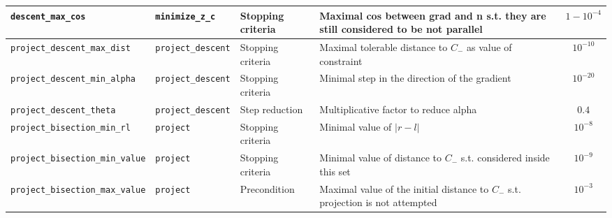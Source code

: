 \documentclass[a4paper]{article}
\begin{document}
\begin{tabular}{|p{47mm}|p{27mm}|p{34mm}|p{130mm}|c|}
	{\tt descent\_max\_cos} & {\tt minimize\_z\_c} & Stopping criteria & Maximal cos between grad and n s.t. they are still considered to be not parallel & $1-10^{-4}$ \\\hline
	{\tt project\_descent\_max\_dist} & {\tt project\_descent} & Stopping criteria & Maximal tolerable distance to $C_-$ as value of constraint & $10^{-10}$ \\\hline
	{\tt project\_descent\_min\_alpha} & {\tt project\_descent} & Stopping criteria & Minimal step in the direction of the gradient & $10^{-20}$ \\\hline
	{\tt project\_descent\_theta} & {\tt project\_descent} & Step reduction & Multiplicative factor to reduce alpha & $0.4$ \\\hline
	{\tt project\_bisection\_min\_rl} & {\tt project} & Stopping criteria & Minimal value of $|r - l|$ & $10^{-8}$ \\\hline
	{\tt project\_bisection\_min\_value} & {\tt project} & Stopping criteria & Minimal value of distance to $C_-$ s.t. considered inside this set & $10^{-9}$ \\\hline
	{\tt project\_bisection\_max\_value} & {\tt project} & Precondition & Maximal value of the initial distance to $C_-$ s.t. projection is not attempted & $10^{-3}$ \\\hline
\end{tabular}
\end{document}
